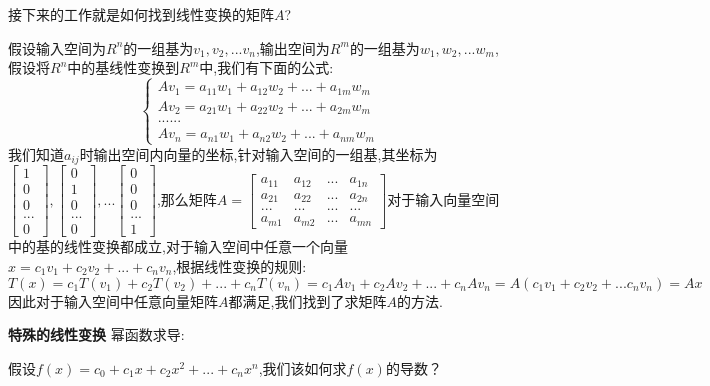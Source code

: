 \documentclass[oneside]{book}
\begin{document}
接下来的工作就是如何找到线性变换的矩阵$A$?

假设输入空间为$R^{n}$的一组基为$v_{1},v_{2},...v_{n}$,输出空间为$R^{m}$的一组基为$w_{1},w_{2},...w_{m}$,假设将$R^{n}$中的基线性变换到$R^{m}$中,我们有下面的公式:
\begin{equation}
	\left\{\begin{array}{c}
		Av_{1}=a_{11}w_{1}+a_{12}w_{2}+...+a_{1m}w_{m}\\Av_{2}=a_{21}w_{1}+a_{22}w_{2}+...+a_{2m}w_{m}\\......\\Av_{n}=a_{n1}w_{1}+a_{n2}w_{2}+...+a_{nm}w_{m}
	\end{array}\right.
\end{equation}
我们知道$a_{ij}$时输出空间内向量的坐标,针对输入空间的一组基,其坐标为$\left[\begin{array}{c}
	1\\0\\0\\...\\0
\end{array}\right],\left[\begin{array}{c}
0\\1\\0\\...\\0
\end{array}\right],...\left[\begin{array}{c}
0\\0\\0\\...\\1
\end{array}\right]$,那么矩阵$A=\left[\begin{array}{cccc}
a_{11}&a_{12}&...&a_{1n}\\a_{21}&a_{22}&...&a_{2n}\\...&...&...&...\\a_{m1}&a_{m2}&...&a_{mn}
\end{array}\right]$对于输入向量空间中的基的线性变换都成立,对于输入空间中任意一个向量$x=c_{1}v_{1}+c_{2}v_{2}+...+c_{n}v_{n}$,根据线性变换的规则:$$T(x)=c_{1}T(v_{1})+c_{2}T(v_{2})+...+c_{n}T(v_{n})=c_{1}Av_{1}+c_{2}Av_{2}+...+c_{n}Av_{n}=A(c_{1}v_{1}+c_{2}v_{2}+...c_{n}v_{n})=Ax$$
因此对于输入空间中任意向量矩阵$A$都满足,我们找到了求矩阵$A$的方法.


	\textbf{特殊的线性变换}
	幂函数求导:
	
	假设$f(x)=c_{0}+c_{1}x+c_{2}x^{2}+...+c_{n}x^{n}$,我们该如何求$f(x)$的导数？
	
\end{document}
